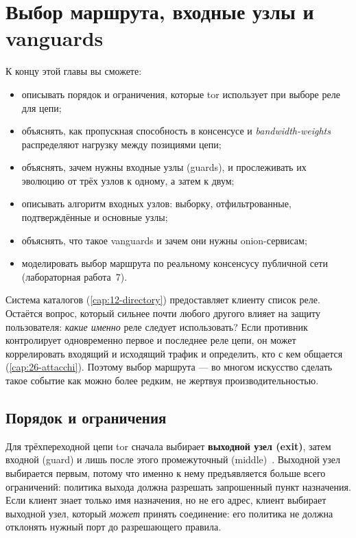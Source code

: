 \chapter{Выбор маршрута, входные узлы и vanguards}\label{cap:13-percorso}

\begin{obiettivi}
К концу этой главы вы сможете:
\begin{itemize}[nosep]
  \item описывать порядок и ограничения, которые tor использует при выборе реле для цепи;
  \item объяснять, как пропускная способность в консенсусе и \emph{bandwidth-weights} распределяют нагрузку между позициями цепи;
  \item объяснять, зачем нужны входные узлы (guards), и прослеживать их эволюцию от трёх узлов к одному, а затем к двум;
  \item описывать алгоритм входных узлов: выборку, отфильтрованные, подтверждённые и основные узлы;
  \item объяснять, что такое vanguards и зачем они нужны onion-сервисам;
  \item моделировать выбор маршрута по реальному консенсусу публичной сети (лабораторная работа~7).
\end{itemize}
\end{obiettivi}

Система каталогов (\cref{cap:12-directory}) предоставляет клиенту список реле. Остаётся вопрос, который сильнее почти любого другого влияет на защиту пользователя: \emph{какие именно} реле следует использовать? Если противник контролирует одновременно первое и последнее реле цепи, он может коррелировать входящий и исходящий трафик и определить, кто с кем общается (\cref{cap:26-attacchi}). Поэтому выбор маршрута --- во многом искусство сделать такое событие как можно более редким, не жертвуя производительностью.

\section{Порядок и ограничения}\label{sec:percorso-vincoli}

Для трёхпереходной цепи tor сначала выбирает \textbf{выходной узел (exit)}, затем входной (guard) и лишь после этого промежуточный (middle)~. Выходной узел выбирается первым, потому что именно к нему предъявляется больше всего ограничений: политика выхода должна разрешать запрошенный пункт назначения. Если клиент знает только имя назначения, но не его адрес, клиент выбирает выходной узел, который \emph{может} принять соединение: его политика не должна отклонять нужный порт до разрешающего правила.

